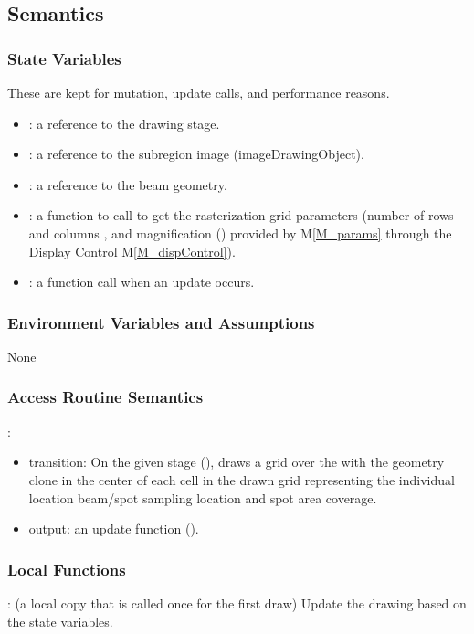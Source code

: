 \documentclass[12pt, titlepage]{article}
\newcommand{\mref}[1]{M\ref{#1}}
\begin{document}
\subsection{Semantics}

\subsubsection{State Variables}
These are kept for mutation, update calls, and performance reasons.
\begin{itemize}
  \item {}: a reference to the drawing stage.
  \item {}: a reference to the subregion image (imageDrawingObject).
  \item {}: a reference to the beam geometry.
  \item {}: a function to call to get the rasterization
    grid parameters (number of rows  and columns ,
    and magnification () 
    provided by \mref{M_params}
    through the Display Control \mref{M_dispControl}).
  \item {}: a function call when an update occurs.
\end{itemize}

\subsubsection{Environment Variables and Assumptions}
None

\subsubsection{Access Routine Semantics}

\noindent {}:
\begin{itemize}
\item transition: On the given stage (), draws a grid over the  with
  the  geometry clone in the center of each cell in the drawn grid
  representing the individual location beam/spot sampling location and spot area coverage.
\item output: an update function ().
\end{itemize}

\subsubsection{Local Functions}
: (a local copy that is called once for the first draw)
  Update the drawing based on the state variables.
\end{document}
